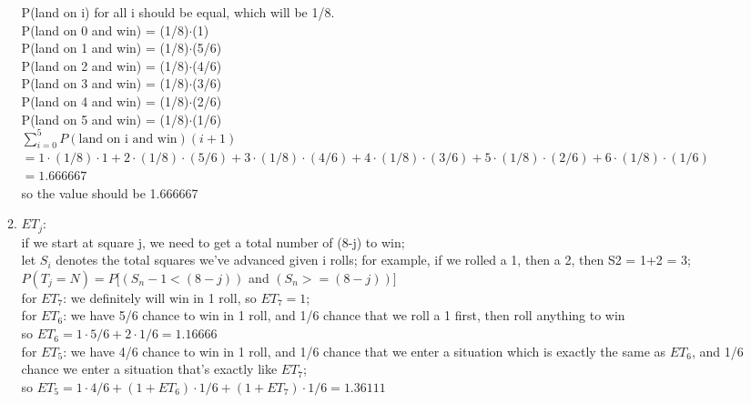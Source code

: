 \documentclass{amsart}
\begin{document}
\begin{enumerate}
\begin{enumerate}
  P(land on i) for all i should be equal, which will be 1/8.\\
  P(land on 0 and win) = (1/8)$\cdot$(1)\\
  P(land on 1 and win) = (1/8)$\cdot$(5/6)\\
  P(land on 2 and win) = (1/8)$\cdot$(4/6)\\
  P(land on 3 and win) = (1/8)$\cdot$(3/6)\\
  P(land on 4 and win) = (1/8)$\cdot$(2/6)\\
  P(land on 5 and win) = (1/8)$\cdot$(1/6)\\
$\displaystyle\sum^5_{i=0}P(\text{land on i and win})(i+1)$\\$= 1\cdot(1/8)\cdot1 + 2\cdot(1/8)\cdot(5/6) + 3\cdot(1/8)\cdot(4/6)+4\cdot(1/8)\cdot(3/6)+5\cdot(1/8)\cdot(2/6)+6\cdot(1/8)\cdot(1/6)$\\$ = 1.666667$\\
so the value should be 1.666667
  
\item $ET_j$:\\
if we start at square j, we need to get a total number of (8-j) to win;\\
  let $S_i$ denotes the total squares we've advanced given i rolls; for example, if we rolled a 1, then a 2, then S2 = 1+2 = 3;\\
  $P(T_j = N) = P[(S_n-1 < (8-j))$ and $( S_n >= (8-j))]$\\
  for $ET_7$: we definitely will win in 1 roll, so $ET_7 = 1$;\\
  for $ET_6$: we have 5/6 chance to win in 1 roll, and 1/6 chance that we roll a 1 first, then roll anything to win\\
    so $ET_6 = 1\cdot5/6 + 2\cdot1/6 = 1.16666$\\
  for $ET_5$: we have 4/6 chance to win in 1 roll, and 1/6 chance that we enter a situation which is exactly the same as $ET_6$, and 1/6 chance we enter a situation that's exactly like $ET_7$;\\
    so $ET_5 = 1\cdot4/6 + (1+ET_6)\cdot1/6  + (1+ET_7)\cdot1/6 =  1.36111$\\
  

\end{enumerate}
\end{enumerate}
\end{document}
